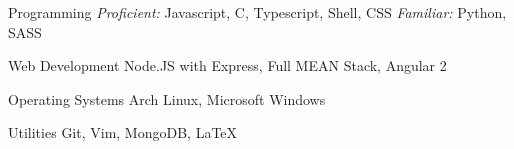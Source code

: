 

\begin{cvskills}

  \cvskill
    {Programming} %
    {\textit{Proficient: } Javascript, C, Typescript, Shell, CSS \hspace{0.3cm}
      \textit{Familiar: } Python, SASS } 

  \cvskill
    {Web Development} %
    {Node.JS with Express, Full MEAN Stack, Angular 2} %
    
  \cvskill
    {Operating Systems} %
    {Arch Linux, Microsoft Windows} %

  \cvskill
    {Utilities} %
    {Git, Vim, MongoDB, \LaTeX} %

\end{cvskills}
